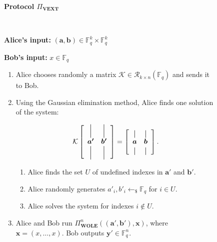 \begin{figure}[h!]
    \centering
        \begin{tcolorbox}
            
            \centerline{\textbf{Protocol $\Pi_{\textbf{VEXT}}$}}
            
            \
    
    \textbf{Alice's input:} $(\bm{a}, \bm{b}) \in \mathbb{F}^k_q\times \mathbb{F}^k_q$ 
    
    \textbf{Bob's input:} $x\in \mathbb{F}_q$
    
\begin{enumerate}
    \item Alice chooses randomly a matrix $\mathcal{K} \in \mathcal{R}_{k\times n}(\mathbb{F}_q)$ and sends it to Bob.
    \item Using the Gaussian elimination method, Alice finds one solution of the system:
    
    \begin{equation*}
\mathcal{K} \left[
  \begin{array}{cc}
    \bigvertbar & \bigvertbar  \\
    \bm{a'} & \bm{b'} \\
    \bigvertbar  & \bigvertbar \\
  \end{array}
\right]  = \left[
  \begin{array}{cc}
    \vertbar & \vertbar\\
    \bm{a} & \bm{b}\\
    \vertbar & \vertbar\\
  \end{array}
\right].\\
\end{equation*}
    
    \begin{enumerate}
        \item Alice finds the set $U$ of undefined indexes in $\bm{a}'$ and $\bm{b}'$.
        \item Alice randomly generates $a'_i, b'_i \leftarrow_{\$}\mathbb{F}_q$ for $i\in U$.
        \item Alice solves the system for indexes $i\notin U$.
    \end{enumerate}
    \item Alice and Bob run $\Pi^n_{\textbf{WOLE}}((\bm{a}', \bm{b}'), \bm{x})$, where $\bm{x} = (x, \ldots, x)$. Bob outputs  $\bm{y}'\in \mathbb{F}_q^n$.
    

\end{enumerate}
\end{tcolorbox}
\end{figure}
